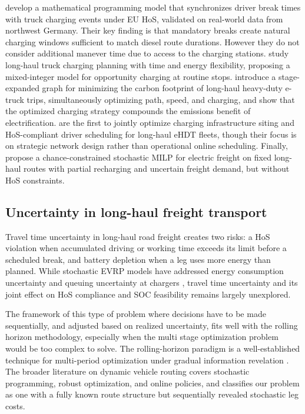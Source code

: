 \documentclass[preprint,12pt,3p]{elsarticle}
\begin{document}
\citet{brockmann_break-and-charge_2025} develop a mathematical programming model that synchronizes driver break times with truck charging events under EU HoS, validated on real-world data from northwest Germany. Their key finding is that mandatory breaks create natural charging windows sufficient to match diesel route durations. However they do not consider additional manever time due to access to the charging stations. \citet{wan_long-haul_2024} study long-haul truck charging planning with time and energy flexibility, proposing a mixed-integer model for opportunity charging at routine stops. \citet{su_optimizing_2025} introduce a stage-expanded graph for minimizing the carbon footprint of long-haul heavy-duty e-truck trips, simultaneously optimizing path, speed, and charging, and show that the optimized charging strategy compounds the emissions benefit of electrification. \citet{vidotte_plaza_charger_2026} are the first to jointly optimize charging infrastructure siting and HoS-compliant driver scheduling for long-haul eHDT fleets, though their focus is on strategic network design rather than operational online scheduling. Finally, \citet{niyomphon_stochastic_2026} propose a chance-constrained stochastic MILP for electric freight on fixed long-haul routes with partial recharging and uncertain freight demand, but without HoS constraints.


\subsection{Uncertainty in long-haul freight transport}
Travel time uncertainty in long-haul road freight creates two risks: a HoS violation when accumulated driving or working time exceeds its limit before a scheduled break, and battery depletion when a leg uses more energy than planned. While stochastic EVRP models have addressed energy consumption uncertainty \citep{pelletier_electric_2019} and queuing uncertainty at chargers \citep{keskin_simulation-based_2021}, travel time uncertainty and its joint effect on HoS compliance and SOC feasibility remains largely unexplored.

The framework of this type of problem where decisions have to be made sequentially, and adjusted based on realized uncertainty, fits well with the rolling horizon methodology, especially when the multi stage optimization problem would be too complex to solve. The rolling-horizon paradigm is a well-established technique for multi-period optimization under gradual information revelation \citep{glomb_rolling-horizon_2022}. The broader literature on dynamic vehicle routing \citep{pillac_review_2013} covers stochastic programming, robust optimization, and online policies, and classifies our problem as one with a fully known route structure but sequentially revealed stochastic leg costs.
\end{document}
